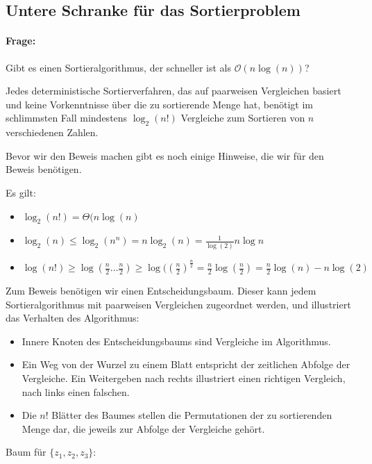 \subsection{Untere Schranke für das Sortierproblem}
\paragraph{Frage:} Gibt es einen Sortieralgorithmus, der schneller ist als $\mathcal{O}(n\log(n))$?

\begin{theorem}
	\label{thm:sortierverfahren}
Jedes deterministische Sortierverfahren, das auf paarweisen Vergleichen basiert und keine Vorkenntnisse über die zu sortierende Menge hat, benötigt im schlimmsten Fall mindestens $\log_2(n!)$ Vergleiche zum Sortieren von $n$ verschiedenen Zahlen.
\end{theorem}
Bevor wir den Beweis machen gibt es noch einige Hinweise, die wir für den Beweis benötigen.
\begin{remark}
	Es gilt:
	\begin{itemize}
		\item  $\log_2(n!) = \Theta(n\log(n)$
		\item $\log_2(n) \le \log_2(n^{n}) = n\log_2(n) = \frac{1}{\log(2)}n \log n$
		\item $\log(n!) \ge \log(\frac{n}{2}\ldots \frac{n}{2}) \ge \log((\frac{n}{2})^{\frac{n}{2}}= \frac{n}{2}\log(\frac{n}{2}) = \frac{n}{2}\log(n) - n\log(2)$
	\end{itemize}
\end{remark}
Zum Beweis benötigen wir einen Entscheidungsbaum. Dieser kann jedem Sortieralgorithmus mit paarweisen Vergleichen zugeordnet werden, und illustriert das Verhalten des Algorithmus:
\begin{itemize}
	\item Innere Knoten des Entscheidungsbaums sind Vergleiche im Algorithmus.
	\item Ein Weg von der Wurzel zu einem Blatt entspricht der zeitlichen Abfolge der Vergleiche. Ein Weitergeben nach rechts illustriert einen richtigen Vergleich, nach links einen falschen.
	\item Die $n!$ Blätter des Baumes stellen die Permutationen der zu sortierenden Menge dar, die jeweils zur Abfolge der Vergleiche gehört.
\end{itemize}
\begin{example}
Baum für $\{z_1,z_2,z_3\}$: \\
%
%
%
%
%
\end{example}

